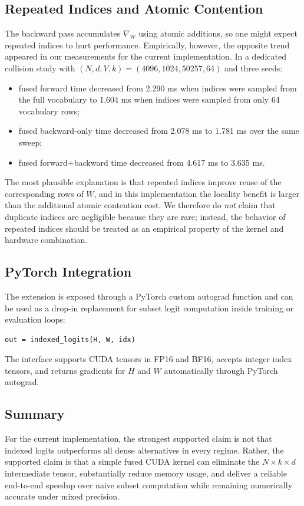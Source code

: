 \subsection{Repeated Indices and Atomic Contention}

The backward pass accumulates $\nabla_W$ using atomic additions, so one might expect repeated indices to hurt performance. Empirically, however, the opposite trend appeared in our measurements for the current implementation. In a dedicated collision study with $(N,d,V,k)=(4096,1024,50257,64)$ and three seeds:
\begin{itemize}
\item fused forward time decreased from 2.290 ms when indices were sampled from the full vocabulary to 1.604 ms when indices were sampled from only 64 vocabulary rows;
\item fused backward-only time decreased from 2.078 ms to 1.781 ms over the same sweep;
\item fused forward+backward time decreased from 4.617 ms to 3.635 ms.
\end{itemize}

The most plausible explanation is that repeated indices improve reuse of the corresponding rows of $W$, and in this implementation the locality benefit is larger than the additional atomic contention cost. We therefore do \emph{not} claim that duplicate indices are negligible because they are rare; instead, the behavior of repeated indices should be treated as an empirical property of the kernel and hardware combination.

\subsection{PyTorch Integration}

The extension is exposed through a PyTorch custom autograd function and can be used as a drop-in replacement for subset logit computation inside training or evaluation loops:
\begin{verbatim}
out = indexed_logits(H, W, idx)
\end{verbatim}
The interface supports CUDA tensors in FP16 and BF16, accepts integer index tensors, and returns gradients for $H$ and $W$ automatically through PyTorch autograd.

\subsection{Summary}

For the current implementation, the strongest supported claim is not that indexed logits outperforms all dense alternatives in every regime. Rather, the supported claim is that a simple fused CUDA kernel can eliminate the $N \times k \times d$ intermediate tensor, substantially reduce memory usage, and deliver a reliable end-to-end speedup over naive subset computation while remaining numerically accurate under mixed precision.
